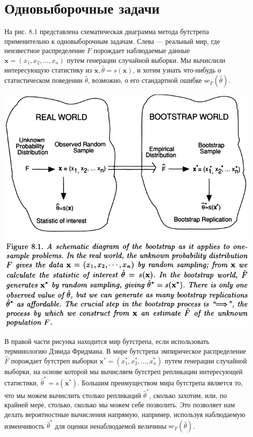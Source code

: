 \section{Одновыборочные задачи}

На рис. 8.1 представлена схематическая диаграмма метода бутстрепа применительно к одновыборочным задачам. Слева --- реальный мир, где неизвестное распределение $F$ порождает наблюдаемые данные $\textbf{x} = (x_1, x_2, \ldots, x_n)$ путем генерации случайной выборки. Мы вычислили интересующую статистику из $\textbf{x}, \hat{\theta} = s(\textbf{x})$, и хотим узнать что-нибудь о статистическом поведении $\hat{\theta}$, возможно, о его стандартной ошибке $\text{se}_F (\hat{\theta})$.

\noindent
\includegraphics[width=\linewidth]{8/f81}
\newline

В правой части рисунка находится мир бутстрепа, если использовать терминологию Дэвида Фридмана. В мире бутстрепа эмпирическое распределение $\hat{F}$ порождает бутстреп выборки $\textbf{x}^* = (x_1^*, x_2^*, \ldots, x_n^*)$ путем генерации случайной выборки, на основе которой мы вычисляем бутстреп репликации интересующей статистики, $\hat{\theta}^* = s(\textbf{x}^*)$. Большим преимуществом мира бутстрепа является то, что мы можем вычислить столько репликаций $\hat{\theta}^*$, сколько захотим, или, по крайней мере, столько, сколько мы можем себе позволить. Это позволяет нам делать вероятностные вычисления напрямую, например, используя наблюдаемую изменчивость $\hat{\theta}^*$ для оценки ненаблюдаемой величины $\text{se}_F(\hat{\theta})$.

